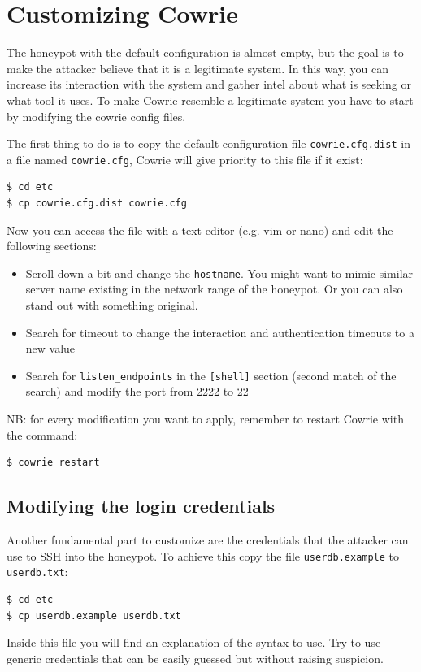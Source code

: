 \documentclass[epsfig,a4paper,11pt,titlepage,oneside,openany]{book}
\begin{document}
\section{Customizing Cowrie}
The honeypot with the default configuration is almost empty, but the goal is to make the attacker believe that it is a legitimate system. In this way, you can increase its interaction with the system and gather intel about what is seeking or what tool it uses. To make Cowrie resemble a legitimate system you have to start by modifying the cowrie config files.

The first thing to do is to copy the default configuration file \texttt{cowrie.cfg.dist} in a file named \texttt{cowrie.cfg}, Cowrie will give priority to this file if it exist:
\begin{lstlisting}[language=bash]
$ cd etc
$ cp cowrie.cfg.dist cowrie.cfg
\end{lstlisting}
Now you can access the file with a text editor (e.g. vim or nano) and edit the following sections:
\begin{itemize}
\item Scroll down a bit and change the \texttt{hostname}. You might want to mimic similar server name existing in the network range of the honeypot. Or you can also stand out with something original.
\item Search for timeout to change the interaction and authentication timeouts to a new value
\item Search for \texttt{listen\_endpoints} in the \texttt{[shell]} section (second match of the search) and modify the port from 2222 to 22
\end{itemize}

\noindent NB: for every modification you want to apply, remember to restart Cowrie with the command:

\begin{lstlisting}[language=bash]
$ cowrie restart
\end{lstlisting}

\subsection{Modifying the login credentials}
\label{sub:login}
Another fundamental part to customize are the credentials that the attacker can use to SSH into the honeypot. To achieve this copy the file \texttt{userdb.example} to \texttt{userdb.txt}:
\begin{lstlisting}[language=bash]
$ cd etc
$ cp userdb.example userdb.txt
\end{lstlisting}
Inside this file you will find an explanation of the syntax to use.
Try to use generic credentials that can be easily guessed but without raising suspicion.
\end{document}
